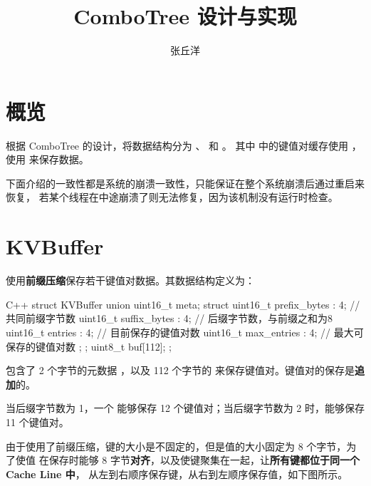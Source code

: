\documentclass{mydoc}
\author{张丘洋}
\title{\dabiaosong ComboTree 设计与实现}
\begin{document}
\maketitle

\section{概览}

根据 ComboTree 的设计，将数据结构分为 、 和 。
其中  中的键值对缓存使用 ，
使用  来保存数据。

下面介绍的一致性都是系统的崩溃一致性，只能保证在整个系统崩溃后通过重启来恢复，
若某个线程在中途崩溃了则无法修复，因为该机制没有运行时检查。

\section{KVBuffer}

 使用\textbf{前缀压缩}保存若干键值对数据。其数据结构定义为：

\begin{codes}{C++}
struct KVBuffer {
  union {
    uint16_t meta;
    struct {
      uint16_t prefix_bytes : 4;  // 共同前缀字节数
      uint16_t suffix_bytes : 4;  // 后缀字节数，与前缀之和为8
      uint16_t entries      : 4;  // 目前保存的键值对数
      uint16_t max_entries  : 4;  // 最大可保存的键值对数
    };
  };
  uint8_t buf[112];
};
\end{codes}

 包含了 2 个字节的元数据 ，以及 112 个字节的 
来保存键值对。键值对的保存是\textbf{追加}的。

当后缀字节数为 1，一个  能够保存 12 个键值对；当后缀字节数为 2
时，能够保存 11 个键值对。

由于使用了前缀压缩，键的大小是不固定的，但是值的大小固定为 8 个字节，为了使值
在保存时能够 8 字节\textbf{对齐}，以及使键聚集在一起，让\textbf{所有键都位于同一个
Cache Line 中}， 从左到右顺序保存键，从右到左顺序保存值，如下图所示。

\begin{figure}[!htbp]
\centering
{}
\end{figure}
\end{document}
